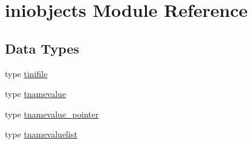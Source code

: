 \hypertarget{namespaceiniobjects}{}\section{iniobjects Module Reference}
\label{namespaceiniobjects}
\subsection*{Data Types}
\begin{DoxyCompactItemize}
\item 
type \mbox{\hyperlink{structiniobjects_1_1tinifile}{tinifile}}
\item 
type \mbox{\hyperlink{structiniobjects_1_1tnamevalue}{tnamevalue}}
\item 
type \mbox{\hyperlink{structiniobjects_1_1tnamevalue__pointer}{tnamevalue\+\_\+pointer}}
\item 
type \mbox{\hyperlink{structiniobjects_1_1tnamevaluelist}{tnamevaluelist}}
\end{DoxyCompactItemize}
